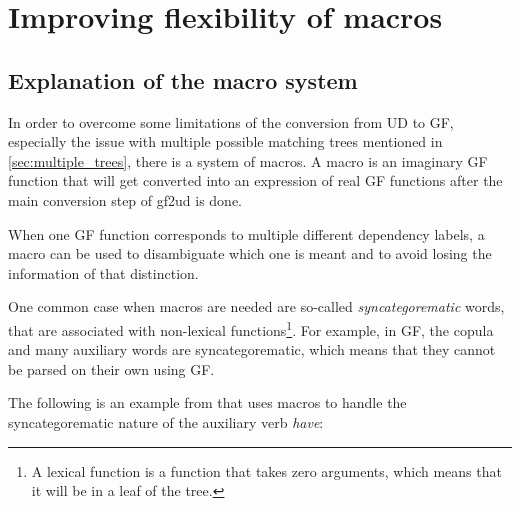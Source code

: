 \chapter{Improving flexibility of macros}\label{sect:flex}
\label{improving-flexibility-macros}


\section{Explanation of the macro system}


In order to overcome some limitations of the conversion from UD to GF, especially the issue with multiple possible matching trees mentioned in \autoref{sec:multiple_trees}, there is a system of macros. A macro is an imaginary GF function that will get converted into an expression of real GF functions after the main conversion step of gf2ud is done.


When one GF function corresponds to multiple different dependency labels, a macro can be used to disambiguate which one is meant and to avoid losing the information of that distinction.

One common case when macros are needed are so-called \emph{syncategorematic} words, that are associated with non-lexical functions\footnote{A lexical function is a function that takes zero arguments, which means that it will be in a leaf of the tree.}. For example, in GF, the copula and many auxiliary words are syncategorematic, which means that they cannot be parsed on their own using GF.

The following is an example from \cite{kolachina-ranta-2017} that uses macros to handle the syncategorematic nature of the auxiliary verb \emph{have}:

